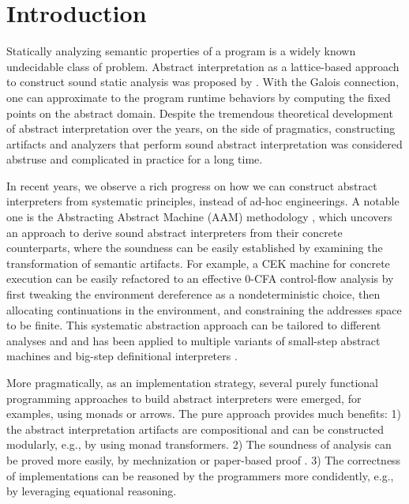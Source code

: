 \section{Introduction} \label{intro}

Statically analyzing semantic properties of a program is a widely
known undecidable class of problem. Abstract interpretation as a
lattice-based approach to construct sound static analysis was proposed
by \citet{DBLP:conf/popl/CousotC77}. With the Galois connection, one
can approximate to the program runtime behaviors by computing the
fixed points on the abstract domain. Despite the tremendous
theoretical development of abstract interpretation over the years, on
the side of pragmatics, constructing artifacts and analyzers that
perform sound abstract interpretation was considered abstruse and
complicated in practice for a long time.

In recent years, we observe a rich progress on how we can construct
abstract interpreters from systematic principles, instead of ad-hoc
engineerings. A notable one is the Abstracting Abstract Machine (AAM)
methodology \cite{DBLP:journals/jfp/HornM12, DBLP:conf/icfp/HornM10},
which uncovers an approach to derive sound abstract interpreters from
their concrete counterparts, where the soundness can be easily
established by examining the transformation of semantic artifacts. For
example, a CEK machine \cite{DBLP:conf/popl/FelleisenF87} for concrete
execution can be easily refactored to an effective 0-CFA control-flow
analysis \cite{Shivers:1988:CFA:53990.54007, Midtgaard:2012:CAF:2187671.2187672}
by first tweaking the environment dereference as a nondeterministic choice,
then allocating continuations in the environment, and constraining the
addresses space to be finite. This systematic abstraction approach can
be tailored to different analyses 
\cite{DBLP:conf/icfp/Gilray0M16, DBLP:conf/popl/GilrayL0MH16} and and
has been applied to multiple variants of small-step abstract machines
\cite{DBLP:journals/jfp/HornM12, DBLP:conf/icfp/HornM10,
  Sergey:2013:MAI:2491956.2491979} and big-step definitional
interpreters \cite{Wei:2018:RAA:3243631.3236800,
  DBLP:journals/pacmpl/DaraisLNH17, Keidel:2018:CSP:3243631.3236767}.

More pragmatically, as an implementation strategy, several purely
functional programming approaches to build abstract interpreters were
emerged, for examples, using monads or arrows. The pure approach
provides much benefits: 1) the abstract interpretation artifacts are
compositional and can be constructed modularly, e.g., by using
monad transformers. 2) The soundness of analysis can be proved more easily, by
mechnization \cite{Darais:2016:CGC:2951913.2951934} or paper-based
proof \cite{Keidel:2018:CSP:3243631.3236767}.  3) The correctness of
implementations can be reasoned by the programmers more condidently,
e.g., by leveraging equational reasoning.

